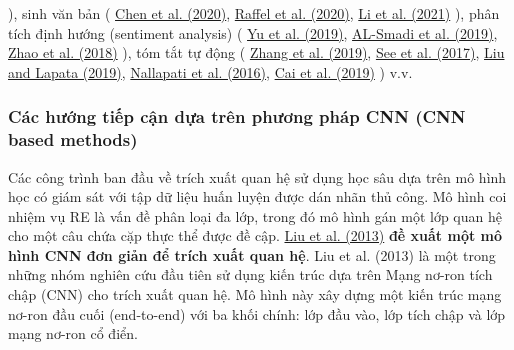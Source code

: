 ), sinh văn bản (
\href{https://www.sciencedirect.com/science/article/pii/S2667305323000698#br0240}{Chen et al. (2020)},
\href{https://www.sciencedirect.com/science/article/pii/S2667305323000698#br1120}{Raffel et al. (2020)},
\href{https://www.sciencedirect.com/science/article/pii/S2667305323000698#br0710}{Li et al. (2021)}
),
phân tích định hướng (sentiment analysis) (
\href{https://www.sciencedirect.com/science/article/pii/S2667305323000698#br1510}{Yu et al. (2019)},
\href{https://www.sciencedirect.com/science/article/pii/S2667305323000698#br0020}{AL-Smadi et al. (2019)},
\href{https://www.sciencedirect.com/science/article/pii/S2667305323000698#br1640}{Zhao et al. (2018)}
), tóm tắt tự động (
\href{https://www.sciencedirect.com/science/article/pii/S2667305323000698#br1600}{Zhang et al. (2019)},
\href{https://www.sciencedirect.com/science/article/pii/S2667305323000698#br1230}{See et al. (2017)},
\href{https://www.sciencedirect.com/science/article/pii/S2667305323000698#br0770}{Liu and Lapata (2019)},
\href{https://www.sciencedirect.com/science/article/pii/S2667305323000698#br0970}{Nallapati et al. (2016)},
\href{https://www.sciencedirect.com/science/article/pii/S2667305323000698#br0180}{Cai et al. (2019)}
) v.v.

\subsubsection{Các hướng tiếp cận dựa trên phương pháp CNN (CNN based methods)}

\begin{singlespace}
    Các công trình ban đầu về trích xuất quan hệ sử dụng học sâu dựa trên mô hình học có giám sát
    với tập dữ liệu huấn luyện được dán nhãn thủ công. Mô hình coi nhiệm vụ RE là vấn đề phân loại
    đa lớp, trong đó mô hình gán một lớp quan hệ cho một câu chứa cặp thực thể được đề cập.
    \href{https://scholar.google.com/scholar_lookup?title=Convolution%20neural%20network%20for%20relation%20extraction&publication_year=2013&author=C.%20Liu&author=W.%20Sun&author=W.%20Chao&author=W.%20Che}{Liu et al. (2013)} \textbf{đề xuất một mô hình CNN đơn giản để trích xuất quan hệ}.
    Liu et al. (2013) là một trong những nhóm nghiên cứu đầu tiên sử dụng kiến trúc dựa trên Mạng nơ-ron tích chập (CNN) cho trích xuất quan hệ. Mô hình này xây dựng một kiến trúc mạng nơ-ron đầu cuối (end-to-end) với ba khối chính: lớp đầu vào, lớp tích chập và lớp mạng nơ-ron cổ điển.
\end{singlespace}

